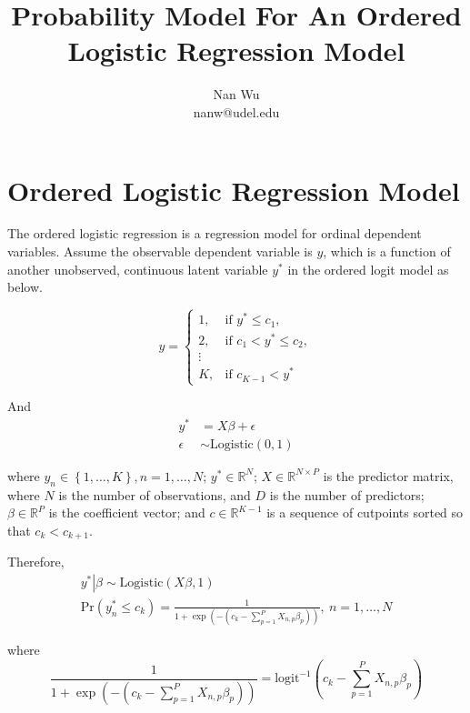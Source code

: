 \documentclass[12pt]{article}
\def\eqa{\left(c_k - \sum \limits_{p=1}^P X_{n,p}\beta_p \right)}
\begin{document}
\title{Probability Model For An Ordered Logistic Regression Model}
\author{Nan Wu \\ nanw@udel.edu}
\date{}
\maketitle

\section{Ordered Logistic Regression Model}

The ordered logistic regression is a regression model for ordinal dependent variables. Assume the observable dependent variable is $y$, which is a function of another unobserved, continuous latent variable $y^*$ in the ordered logit model as below.

\begin{equation*}
  y= \begin{cases}
    1, & \text{if $y^* \leq c_1$},\\
    2, & \text{if $c_1 < y^* \leq c_2$},\\
    \vdots \\
    K, & \text{if $c_{K-1} < y^*$}
  \end{cases}
\end{equation*}

And
\begin{align*}
  y^* &= X\beta + \epsilon \\
  \epsilon &\sim \mathrm{Logistic}\left(0,1\right)
\end{align*}

where $y_n \in \left \{1,\ldots, K\right \}, n=1,\ldots,N$; $y^* \in \mathbb{R}^N$; $X\in \mathbb{R}^{N \times P}$ is the predictor matrix, where $N$ is the number of observations, and $D$ is the number of predictors; $\beta \in \mathbb{R}^P$ is the coefficient vector; and $c \in \mathbb{R}^{K-1}$  is a sequence of cutpoints sorted so that $c_k<c_{k+1}$.

Therefore,
\begin{gather*}
  \left. y^* \right|\beta \sim \mathrm{Logistic}\left(X\beta, 1\right)\\
  \mathrm{Pr}\left(y^*_n \leq c_k\right)=\frac{1}{1+\exp \left(-\eqa \right)}, \ n=1,\ldots,N
\end{gather*}

where
\begin{equation}
  \frac{1}{1+\exp \left(- \eqa \right)}= \mathrm{logit}^{-1}\eqa
\end{equation}
\end{document}
